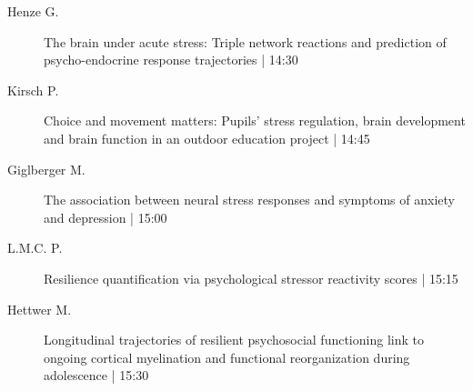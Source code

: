 \begin{symposium}
\begin{description}
                \item [ Henze G.] The brain under acute stress: Triple network reactions and prediction of psycho-endocrine response trajectories \textcolor{mygray}{ | 14:30}    
                
                \item [ Kirsch P.] Choice and movement matters: Pupils' stress regulation, brain development and brain function in an outdoor education project  \textcolor{mygray}{ | 14:45}    
                
                \item [ Giglberger M.] The association between neural stress responses and symptoms of anxiety and depression \textcolor{mygray}{ | 15:00}    
                
                \item [ L.M.C. P.] Resilience quantification via psychological stressor reactivity scores \textcolor{mygray}{ | 15:15}    
                
                \item [ Hettwer M.] Longitudinal trajectories of resilient psychosocial functioning link to ongoing cortical myelination and functional reorganization during adolescence \textcolor{mygray}{ | 15:30}    
                
            \end{description} 
            \end{symposium}
            